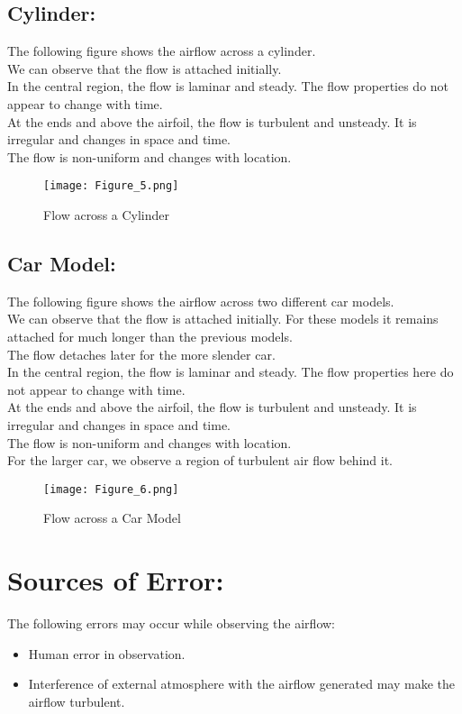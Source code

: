 \documentclass[12pt,a4paper]{article}
\begin{document}
\subsection{Cylinder:}
The following figure shows the airflow across a cylinder.\\
We can observe that the flow is attached initially.\\
In the central region, the flow is laminar and steady. The flow properties do not appear to change with time.\\
At the ends and above the airfoil, the flow is turbulent and unsteady. It is irregular and changes in space and time.\\
The flow is non-uniform and changes with location.
\newpage
\begin{figure}[!ht]
	\begin{center}
			\texttt{[image: Figure\_5.png]}
	\end{center}
	\caption{Flow across a Cylinder}
\end{figure}
\subsection{Car Model:}
The following figure shows the airflow across two different car models.\\
We can observe that the flow is attached initially. For these models it remains attached for much longer than the previous models.\\
The flow detaches later for the more slender car.\\
In the central region, the flow is laminar and steady. The flow properties here do not appear to change with time.\\
At the ends and above the airfoil, the flow is turbulent and unsteady. It is irregular and changes in space and time.\\
The flow is non-uniform and changes with location.\\
For the larger car, we observe a region of turbulent air flow behind it.
\newpage
\begin{figure}[h]
	\begin{center}
			\texttt{[image: Figure\_6.png]}
	\end{center}
	\caption{Flow across a Car Model}
\end{figure}
\section{Sources of Error:}
The following errors may occur while observing the airflow:
\begin{itemize}
\item Human error in observation.
\item Interference of external atmosphere with the airflow generated may make the airflow turbulent.
\end{itemize}
\end{document}

